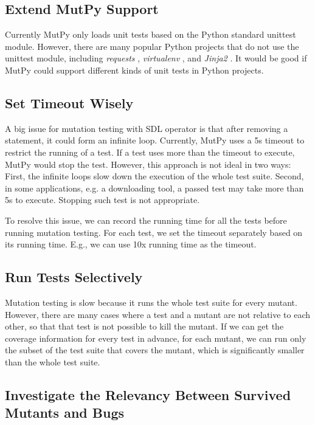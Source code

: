 \documentclass[12pt]{article}
\begin{document}
\subsection{Extend MutPy Support}

Currently MutPy only loads unit tests based on the Python standard unittest module. However, there are many popular Python projects that do not use the unittest module, including \emph{requests} \cite{requests}, \emph{virtualenv} \cite{virtualenv}, and \emph{Jinja2} \cite{jinja2}. It would be good if MutPy could support different kinds of unit tests in Python projects.

\subsection{Set Timeout Wisely}

A big issue for mutation testing with SDL operator is that after removing a statement, it could form an infinite loop. Currently, MutPy uses a 5s timeout to restrict the running of a test. If a test uses more than the timeout to execute, MutPy would stop the test. However, this approach is not ideal in two ways: First, the infinite loops slow down the execution of the whole test suite. Second, in some applications, e.g. a downloading tool, a passed test may take more than 5s to execute. Stopping such test is not appropriate.

To resolve this issue, we can record the running time for all the tests before running mutation testing. For each test, we set the timeout separately based on its running time. E.g., we can use 10x running time as the timeout.

\subsection{Run Tests Selectively}

Mutation testing is slow because it runs the whole test suite for every mutant. However, there are many cases where a test and a mutant are not relative to each other, so that that test is not possible to kill the mutant. If we can get the coverage information for every test in advance, for each mutant, we can run only the subset of the test suite that covers the mutant, which is significantly smaller than the whole test suite.

\subsection{Investigate the Relevancy Between Survived Mutants and Bugs}
\end{document}
